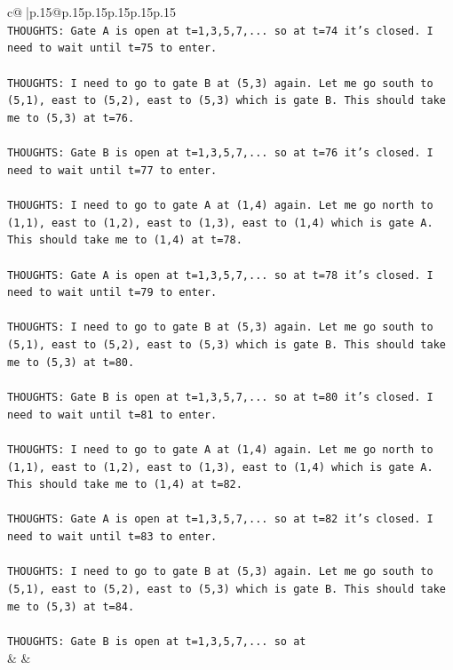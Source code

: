 \documentclass{article}
\begin{document}
{\begin{supertabular}{c@{$\;$}|p{.15\linewidth}@{}p{.15\linewidth}p{.15\linewidth}p{.15\linewidth}p{.15\linewidth}p{.15\linewidth}}
{{{\\ 
\texttt{THOUGHTS: Gate A is open at t=1,3,5,7,... so at t=74 it's closed. I need to wait until t=75 to enter.} \\
\\ 
\texttt{THOUGHTS: I need to go to gate B at (5,3) again. Let me go south to (5,1), east to (5,2), east to (5,3) which is gate B. This should take me to (5,3) at t=76.} \\
\\ 
\texttt{THOUGHTS: Gate B is open at t=1,3,5,7,... so at t=76 it's closed. I need to wait until t=77 to enter.} \\
\\ 
\texttt{THOUGHTS: I need to go to gate A at (1,4) again. Let me go north to (1,1), east to (1,2), east to (1,3), east to (1,4) which is gate A. This should take me to (1,4) at t=78.} \\
\\ 
\texttt{THOUGHTS: Gate A is open at t=1,3,5,7,... so at t=78 it's closed. I need to wait until t=79 to enter.} \\
\\ 
\texttt{THOUGHTS: I need to go to gate B at (5,3) again. Let me go south to (5,1), east to (5,2), east to (5,3) which is gate B. This should take me to (5,3) at t=80.} \\
\\ 
\texttt{THOUGHTS: Gate B is open at t=1,3,5,7,... so at t=80 it's closed. I need to wait until t=81 to enter.} \\
\\ 
\texttt{THOUGHTS: I need to go to gate A at (1,4) again. Let me go north to (1,1), east to (1,2), east to (1,3), east to (1,4) which is gate A. This should take me to (1,4) at t=82.} \\
\\ 
\texttt{THOUGHTS: Gate A is open at t=1,3,5,7,... so at t=82 it's closed. I need to wait until t=83 to enter.} \\
\\ 
\texttt{THOUGHTS: I need to go to gate B at (5,3) again. Let me go south to (5,1), east to (5,2), east to (5,3) which is gate B. This should take me to (5,3) at t=84.} \\
\\ 
\texttt{THOUGHTS: Gate B is open at t=1,3,5,7,... so at} \\
            }
        }
    }
    & & \\ \\


\end{supertabular}}
\end{document}
